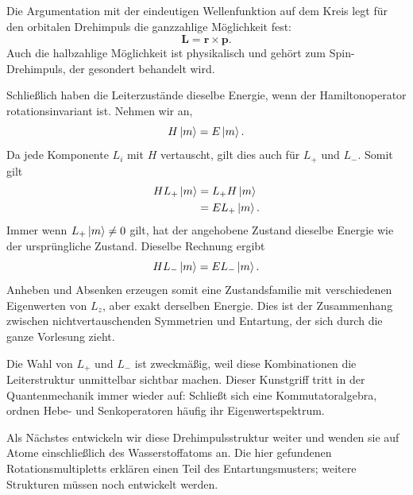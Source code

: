 Die Argumentation mit der eindeutigen Wellenfunktion auf dem Kreis legt für den orbitalen Drehimpuls die ganzzahlige Möglichkeit fest:
\begin{equation}
\mathbf L=\mathbf r\times\mathbf p.
\end{equation}
Auch die halbzahlige Möglichkeit ist physikalisch und gehört zum Spin-Drehimpuls, der gesondert behandelt wird.

Schließlich haben die Leiterzustände dieselbe Energie, wenn der Hamiltonoperator rotationsinvariant ist. Nehmen wir an,
\begin{equation}
H\left\lvert m\right\rangle=E\left\lvert m\right\rangle.
\end{equation}
Da jede Komponente \(L_i\) mit \(H\) vertauscht, gilt dies auch für \(L_+\) und \(L_-\). Somit gilt
\begin{align}
H L_+\left\lvert m\right\rangle
&=L_+H\left\lvert m\right\rangle\\
&=E L_+\left\lvert m\right\rangle.
\end{align}
Immer wenn \(L_+\left\lvert m\right\rangle\neq0\) gilt, hat der angehobene Zustand dieselbe Energie wie der ursprüngliche Zustand. Dieselbe Rechnung ergibt
\begin{equation}
H L_-\left\lvert m\right\rangle=E L_-\left\lvert m\right\rangle.
\end{equation}
Anheben und Absenken erzeugen somit eine Zustandsfamilie mit verschiedenen Eigenwerten von \(L_z\), aber exakt derselben Energie. Dies ist der Zusammenhang zwischen nichtvertauschenden Symmetrien und Entartung, der sich durch die ganze Vorlesung zieht.

\begin{classroomqa}
\end{classroomqa}

Die Wahl von \(L_+\) und \(L_-\) ist zweckmäßig, weil diese Kombinationen die Leiterstruktur unmittelbar sichtbar machen. Dieser Kunstgriff tritt in der Quantenmechanik immer wieder auf: Schließt sich eine Kommutatoralgebra, ordnen Hebe- und Senkoperatoren häufig ihr Eigenwertspektrum.

\begin{classroomqa}
\end{classroomqa}

Als Nächstes entwickeln wir diese Drehimpulsstruktur weiter und wenden sie auf Atome einschließlich des Wasserstoffatoms an. Die hier gefundenen Rotationsmultipletts erklären einen Teil des Entartungsmusters; weitere Strukturen müssen noch entwickelt werden.
